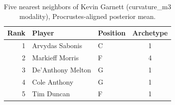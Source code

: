 \begin{table}[htbp]
  \centering\small
  \begin{tabular}{rllc}
    \toprule
    Rank & Player & Position & Archetype \\
    \midrule
    1 & Arvydas Sabonis & C & 1 \\
    2 & Markieff Morris & F & 4 \\
    3 & De'Anthony Melton & G & 1 \\
    4 & Cole Anthony & G & 1 \\
    5 & Tim Duncan & F & 1 \\
    \bottomrule
  \end{tabular}
  \caption{Five nearest neighbors of Kevin Garnett (curvature_m3 modality), Procrustes-aligned posterior mean.}
  \label{tab:Kevin_Garnett_neighbors_curvature_m3}
\end{table}

